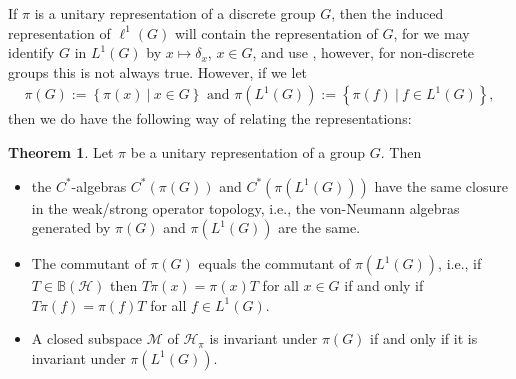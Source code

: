 \documentclass[10pt,twoside,openany,final]{memoir}
\theoremstyle{definition}
\newtheorem{theorem}{Theorem}[chapter]
\theoremstyle{Break}
\renewcommand{\H}{\mathcal{H}}
\begin{document}
If $\pi$ is a unitary representation of a discrete group $G$, then the induced representation of $\ell^1(G)$ will contain the representation of $G$, for we may identify $G$ in $L^1(G)$ by $x \mapsto \delta_x$, $x \in G$, and use , however, for non-discrete groups this is not always true. However, if we let 
\begin{align*}
	\pi(G):=\left\{ \pi(x) \ \big| \ x \in G \right\} \text{  and  } \pi(L^1(G)):=\left\{ \pi(f) \ \big| \ f \in L^1(G) \right\},
\end{align*}
then we do have the following way of relating the representations:
\begin{theorem}
	Let $\pi$ be a unitary representation of a group $G$. Then
	\begin{itemize}
		\item the $C^*$-algebras $C^*(\pi(G))$ and $C^*(\pi(L^1(G)))$ have the same closure in the weak/strong operator topology, i.e., the von-Neumann algebras generated by $\pi(G)$ and $\pi(L^1(G))$ are the same.
		\item The commutant of $\pi(G)$ equals the commutant of $\pi(L^1(G))$, i.e., if $T \in \mathbb{B}(\H)$ then $T\pi(x)=\pi(x)T$ for all $x \in G$ if and only if $T\pi(f)=\pi(f) T$ for all $f \in L^1(G)$.
		\item A closed subspace $\mathcal{M}$ of $\H_\pi$ is invariant under $\pi(G)$ if and only if it is invariant under $\pi(L^1(G))$.
	\end{itemize}
	\label{3.12}
\end{theorem}
\end{document}

